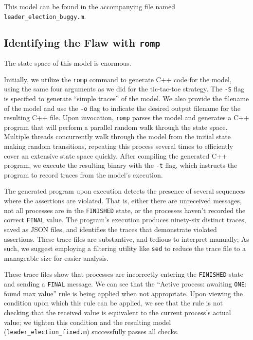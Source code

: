 This model can be found in the accompanying file named
\texttt{leader\_election\_buggy.m}.

\subsection{Identifying the Flaw with \texttt{romp}}\label{subsec:identifying-the-flaw-in-romp}

The state space of this model is enormous.

Initially, we utilize the \texttt{romp} command to generate C++ code for the
model, using the same four arguments as we did for the tic-tac-toe strategy.
The \texttt{-S} flag is specified to generate ``simple traces'' of the model.
We also provide the filename of the model and use the \texttt{-o} flag to
indicate the desired output filename for the resulting C++ file.
Upon invocation, \texttt{romp} parses the model and generates a C++ program
that will perform a parallel random walk through the state space.
Multiple threads concurrently walk through the model from the initial state
making random transitions, repeating this process several times to
efficiently cover an extensive state space quickly.
After compiling the generated C++ program, we execute the resulting binary
with the \texttt{-t} flag, which instructs the program to record traces from
the model's execution.

The generated program upon execution detects the presence of several sequences
where the assertions are violated.
That is, either there are unreceived messages,
not all processes are in the \texttt{FINISHED} state,
or the processes haven't recorded the correct \texttt{FINAL} value.
The program's execution produces ninety-six distinct traces,
saved as JSON files, and identifies the traces that demonstrate violated
assertions.
These trace files are substantive, and tedious to interpret manually;
As such, we suggest employing a filtering utility like \texttt{sed}
to reduce the trace file to a manageable size for easier analysis.

These trace files show that processes are incorrectly entering the
\texttt{FINISHED} state and sending a \texttt{FINAL} message.
We can see that the ``Active process: awaiting \texttt{ONE}: found max value''
rule is being applied when not appropriate.
Upon viewing the condition upon which this rule can be applied, we see that
the rule is not checking that the received value is equivalent to the
current process's actual value;
we tighten this condition and the resulting model
(\texttt{leader\_election\_fixed.m}) successfully passes all checks.

